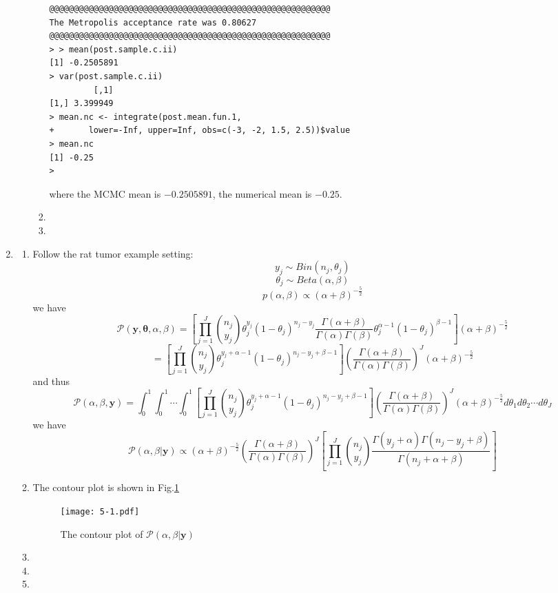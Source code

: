 \documentclass[twoside,11pt]{amsart}
\begin{document}
\begin{enumerate}
\begin{enumerate}
\begin{enumerate}
\begin{small}
\begin{verbatim}
@@@@@@@@@@@@@@@@@@@@@@@@@@@@@@@@@@@@@@@@@@@@@@@@@@@@@@@@@
The Metropolis acceptance rate was 0.80627
@@@@@@@@@@@@@@@@@@@@@@@@@@@@@@@@@@@@@@@@@@@@@@@@@@@@@@@@@
> > mean(post.sample.c.ii)
[1] -0.2505891
> var(post.sample.c.ii)
         [,1]
[1,] 3.399949
> mean.nc <- integrate(post.mean.fun.1, 
+       lower=-Inf, upper=Inf, obs=c(-3, -2, 1.5, 2.5))$value
> mean.nc
[1] -0.25
>         
    \end{verbatim}
      \end{small}
      where the MCMC mean is $-0.2505891$, the numerical mean is $-0.25$.
    \item
    \item
    \end{enumerate}
  \end{enumerate}
\item
  \begin{enumerate}
  \item
    Follow the rat tumor example setting:
    \[
    y_j \sim Bin(n_j, \theta_j)
    \]
    \[
    \theta_j\sim Beta(\alpha, \beta)
    \]
    \[
    p(\alpha, \beta)\propto (\alpha+\beta)^{-\frac{5}{2}}
    \]
    we have
    \[
    \mathscr P(\bm y, \bm\theta, \alpha, \beta) = \left[\prod_{j=1}^J
    { n_j \choose y_j}\theta_j^{y_j}(1-\theta_j)^{n_j-y_j}\frac{\Gamma(\alpha+\beta)}{\Gamma(\alpha)\Gamma(\beta)}\theta_j^{\alpha-1}(1-\theta_j)^{\beta-1}\right](\alpha+\beta)^{-\frac{5}{2}} 
    \]
   \[ =
    \left[\prod_{j=1}^J{n_j \choose y_j}\theta_j^{y_j+\alpha-1}(1-\theta_j)^{n_j-y_j+\beta-1}\right]\left(\frac{\Gamma(\alpha+\beta)}{\Gamma(\alpha)\Gamma(\beta)}\right)^{J}(\alpha+\beta)^{-\frac{5}{2}} 
   \]
   and thus
   \[
   \mathscr P(\alpha, \beta, \bm y) =
   \int_0^1\int_0^1\cdots\int_0^1\left[\prod_{j=1}^J{n_j \choose
       y_j}\theta_j^{y_j+\alpha-1}(1-\theta_j)^{n_j-y_j+\beta-1}\right]\left(\frac{\Gamma(\alpha+\beta)}{\Gamma(\alpha)\Gamma(\beta)}\right)^{J}(\alpha+\beta)^{-\frac{5}{2}}
   d\theta_1d\theta_2\cdots d\theta_J
   \]
   we have
   \[
   \mathscr P (\alpha, \beta|\bm y) \propto
   (\alpha+\beta)^{-\frac{5}{2}}\left(\frac{\Gamma(\alpha+\beta)}{\Gamma(\alpha)\Gamma(\beta)}\right)^{J}
   \left[\prod_{j=1}^J{n_j \choose y_j}\frac{\Gamma(y_j+\alpha)\Gamma(n_j-y_j+\beta)}{\Gamma(n_j+\alpha+\beta)}\right]
   \]
  \item
    The contour plot is shown in Fig.\ref{fig:5-1}
    \begin{figure}[h]
        \texttt{[image: 5-1.pdf]}
        \caption{The contour plot of $\mathscr P(\alpha, \beta|\bm y)$}\label{fig:5-1}
      \end{figure}
  \item
    
  \item

  \item

  \end{enumerate}
  
\end{enumerate}
\end{document}
